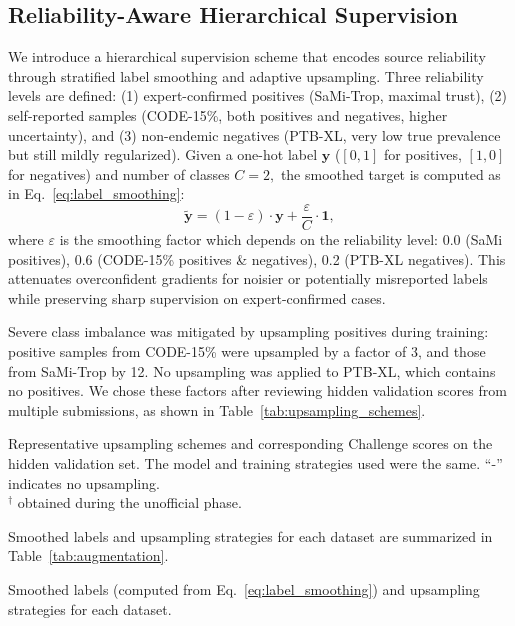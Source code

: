 \subsection{Reliability-Aware Hierarchical Supervision}
\label{subsec:reliability}


We introduce a hierarchical supervision scheme that encodes source reliability through stratified label smoothing and adaptive upsampling. Three reliability levels are defined: (1) expert-confirmed positives (SaMi-Trop, maximal trust), (2) self-reported samples (CODE-15\%, both positives and negatives, higher uncertainty), and (3) non-endemic negatives (PTB-XL, very low true prevalence but still mildly regularized). Given a one-hot label $\mathbf{y}$ ($[0, 1]$ for positives, $[1, 0]$ for negatives) and number of classes $C = 2,$ the smoothed target is computed as in Eq.~\ref{eq:label_smoothing}:
\begin{equation}
\label{eq:label_smoothing}
\tilde{\mathbf{y}} = (1 - \varepsilon) \cdot {\mathbf{y}} + \frac{\varepsilon}{C} \cdot {\mathbf{1}},
\end{equation}
where $\varepsilon$ is the smoothing factor which depends on the reliability level: 0.0 (SaMi positives), 0.6 (CODE-15\% positives \& negatives), 0.2 (PTB-XL negatives). This attenuates overconfident gradients for noisier or potentially misreported labels while preserving sharp supervision on expert-confirmed cases.

Severe class imbalance was mitigated by upsampling positives during training: positive samples from CODE-15\% were upsampled by a factor of 3, and those from SaMi-Trop by 12. No upsampling was applied to PTB-XL, which contains no positives. We chose these factors after reviewing hidden validation scores from multiple submissions, as shown in Table~\ref{tab:upsampling_schemes}.
\begin{table}[!htbp]
\centering

\caption{Representative upsampling schemes and corresponding Challenge scores on the hidden validation set. The model and training strategies used were the same. “-” indicates no upsampling.\\
$^\dagger$ obtained during the unofficial phase.
}
\label{tab:upsampling_schemes}
\end{table}


Smoothed labels and upsampling strategies for each dataset are summarized in Table~\ref{tab:augmentation}.


\begin{table}[!h]
\centering

\caption{Smoothed labels (computed from Eq.~\ref{eq:label_smoothing}) and upsampling strategies for each dataset.}
\label{tab:augmentation}
\end{table}


